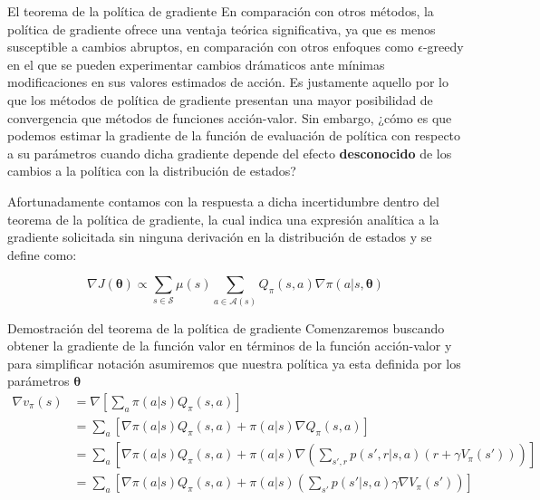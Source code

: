 \documentclass[10pt]{beamer}
\begin{document}
		\begin{frame}{El teorema de la política de gradiente}
			En comparación con otros métodos, la política de gradiente ofrece una ventaja teórica significativa, ya que es menos susceptible a cambios abruptos, en comparación con otros enfoques
			como $\epsilon$-greedy en el que se pueden experimentar cambios drámaticos ante mínimas modificaciones en sus valores estimados de acción. Es justamente aquello por lo que los métodos de 
			política de gradiente presentan una mayor posibilidad de convergencia que métodos de funciones acción-valor.
			Sin embargo, ¿cómo es que podemos estimar la gradiente de la función de evaluación de política con respecto a su parámetros cuando dicha gradiente depende del efecto \textbf{desconocido} de los cambios
			a la política con la distribución de estados?
			\vspace{0.3 cm}

			Afortunadamente contamos con la respuesta a dicha incertidumbre dentro del teorema de la política de gradiente, la cual indica una expresión analítica a la gradiente solicitada sin ninguna derivación en 
			la distribución de estados y se define como:

			\[
			\nabla J(\boldsymbol{\theta}) \propto \sum_{s \in \mathcal{S}} \mu(s) \sum_{a \in \mathcal{A}(s)} Q_{\pi}(s, a) \nabla \pi(a | s, \boldsymbol{\theta})
			\]
		\end{frame}

		\begin{frame}{Demostración del teorema de la política de gradiente}
			Comenzaremos buscando obtener la gradiente de la función valor en términos de la función acción-valor y para simplificar notación asumiremos que nuestra política ya esta definida por los parámetros $\boldsymbol{\theta}$
			\[
			\begin{aligned}
				\nabla v_{\pi}(s) &= \nabla \left[\sum_a \pi(a | s) Q_\pi (s, a)\right] \\
				&= \sum_a \left[\nabla \pi(a | s) Q_\pi(s,a) + \pi(a | s) \nabla Q_\pi(s, a)\right] \\
				&= \sum_a \left[\nabla \pi(a | s) Q_\pi(s,a) + \pi(a | s) \nabla \left( \sum_{s', r} p(s', r | s, a) (r + \gamma V_\pi(s')) \right)\right] \\
				&= \sum_a \left[\nabla \pi(a | s) Q_\pi(s,a) + \pi(a | s) \left( \sum_{s'} p(s' | s, a) \gamma \nabla V_\pi(s') \right)\right] \\
			\end{aligned}
			\]
		\end{frame}
		
\end{document}
